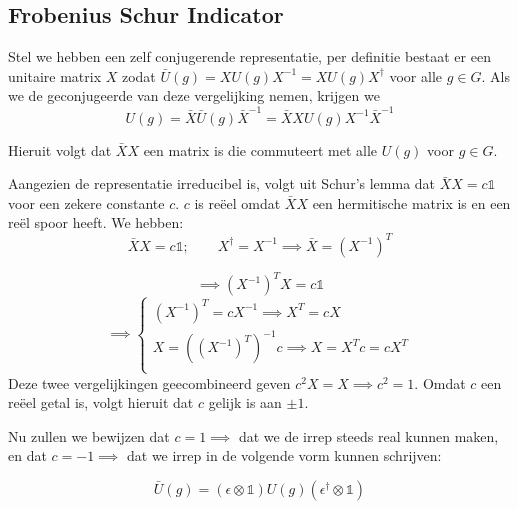 \subsection{Frobenius Schur Indicator}

Stel we hebben een zelf conjugerende representatie, per definitie bestaat er een unitaire matrix \(X\) zodat \(\bar{U}(g) = X U(g) X^{-1} = XU(g)X^{\dagger} \) voor alle \(g \in G\).
Als we de geconjugeerde van deze vergelijking nemen, krijgen we
\[U(g) = \bar{X} \bar{U}(g) \bar{X}^{-1} = \bar{X} X U(g) X^{-1} \bar{X}^{-1}\]

Hieruit volgt dat \(\bar{X} X\) een matrix is die commuteert met alle \(U(g)\) voor \(g \in G\).


Aangezien de representatie irreducibel is, volgt uit Schur's lemma dat \(\bar{X} X = c \mathds{1}\) voor een zekere constante \(c\).
\(c\) is reëel omdat \(\bar{X} X\) een hermitische matrix is en een reël spoor heeft.
We hebben:
\[\bar{X} X = c \mathds{1}; \qquad X^{\dagger} = X^{-1} \implies \bar{X} = (X^{-1})^{T}\]

\[\implies (X^{-1})^{T} X = c \mathds{1} \]
\[
\implies
\begin{cases}
    (X^{-1})^{T} =cX^{-1} \implies X^T = cX \\
     X = ((X^{-1})^T)^{-1}c \implies X = X^T c= c X^T\\
\end{cases}
\]
Deze twee vergelijkingen geecombineerd geven \(c^2 X = X \implies c^2 = 1\).
Omdat \(c\) een reëel getal is, volgt hieruit dat \(c\) gelijk is aan \(\pm 1\).

Nu zullen we bewijzen dat \(c=1 \implies\) dat we de irrep steeds real kunnen maken, en dat \(c=-1 \implies\) dat we irrep in de volgende vorm kunnen schrijven:

\[\bar{U}(g) = (\epsilon \otimes\mathds{1}) U(g) (\epsilon^{\dagger} \otimes\mathds{1})\]

